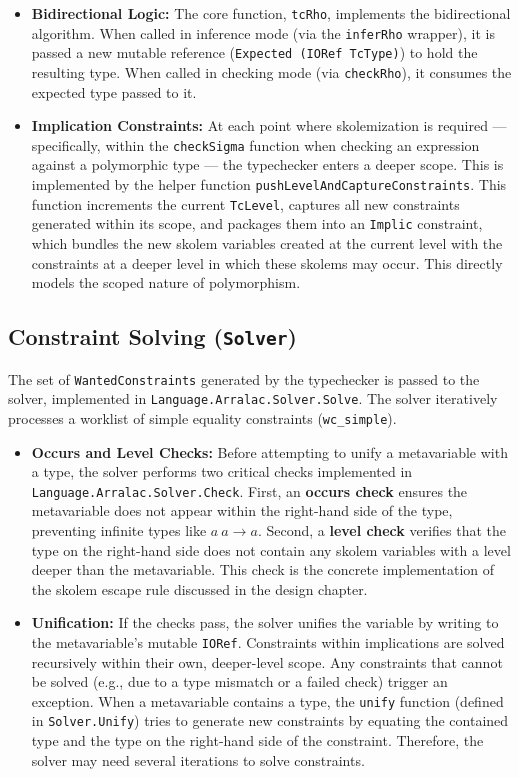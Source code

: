 \begin{itemize}
  \item \textbf{Bidirectional Logic:} The core function, \texttt{tcRho}, implements the bidirectional algorithm. When called in inference mode (via the \texttt{inferRho} wrapper), it is passed a new mutable reference (\texttt{Expected (IORef TcType)}) to hold the resulting type. When called in checking mode (via \texttt{checkRho}), it consumes the expected type passed to it.

  \item \textbf{Implication Constraints:} At each point where skolemization is required --- specifically, within the \texttt{checkSigma} function when checking an expression against a polymorphic type --- the typechecker enters a deeper scope. This is implemented by the helper function \texttt{pushLevelAndCaptureConstraints}. This function increments the current \texttt{TcLevel}, captures all new constraints generated within its scope, and packages them into an \texttt{Implic} constraint, which bundles the new skolem variables created at the current level with the constraints at a deeper level in which these skolems may occur. This directly models the scoped nature of polymorphism.
\end{itemize}

\subsection{Constraint Solving (\texttt{Solver})}
The set of \texttt{WantedConstraints} generated by the typechecker is passed to the solver, implemented in \texttt{Language.Arralac.Solver.Solve}. The solver iteratively processes a worklist of simple equality constraints (\texttt{wc\_simple}).

\begin{itemize}
  \item \textbf{Occurs and Level Checks:} Before attempting to unify a metavariable with a type, the solver performs two critical checks implemented in \texttt{Language.Arralac.Solver.Check}. First, an \textbf{occurs check} ensures the metavariable does not appear within the right-hand side of the type, preventing infinite types like $a ~ a \rightarrow a$. Second, a \textbf{level check} verifies that the type on the right-hand side does not contain any skolem variables with a level deeper than the metavariable. This check is the concrete implementation of the skolem escape rule discussed in the design chapter.

  \item \textbf{Unification:} If the checks pass, the solver unifies the variable by writing to the metavariable's mutable \texttt{IORef}. Constraints within implications are solved recursively within their own, deeper-level scope. Any constraints that cannot be solved (e.g., due to a type mismatch or a failed check) trigger an exception. When a metavariable contains a type, the \texttt{unify} function (defined in \texttt{Solver.Unify}) tries to generate new constraints by equating the contained type and the type on the right-hand side of the constraint. Therefore, the solver may need several iterations to solve constraints.
\end{itemize}


